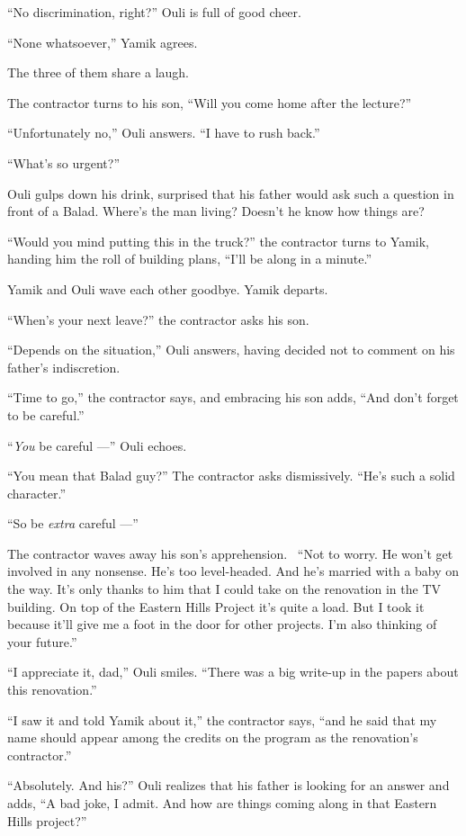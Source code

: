 \documentclass[twoside,11pt,openany]{book}
\begin{document}
``No discrimination, right?'' Ouli is full of good cheer.

``None whatsoever,'' Yamik agrees.

The three of them share a laugh.

The contractor turns to his son, ``Will you come home after the lecture?''

``Unfortunately no,'' Ouli answers. ``I have to rush back.''

``What's so urgent?''

Ouli gulps down his drink, surprised that his father would ask such a question in front of a Balad. Where's the man
living? Doesn't he know how things are?

``Would you mind putting this in the truck?'' the contractor turns to Yamik, handing him the roll of building plans,
``I'll be along in a minute.''

Yamik and Ouli wave each other goodbye. Yamik departs.

``When's your next leave?'' the contractor asks his son.

``Depends on the situation,'' Ouli answers, having decided not to comment on his
father's indiscretion.

``Time to go,'' the contractor says, and embracing his son adds, ``And don't
forget to be careful.''

``\textit{You} be careful ---'' Ouli echoes.

``You mean that Balad guy?'' The contractor asks dismissively. ``He's such a
solid character.''

``So be \textit{extra} careful ---''

The contractor waves away his son's apprehension.~ ``Not to worry. He won't get involved in any nonsense.
He's too level-headed. And he's married with a baby on the way. It's only thanks to him that I could take on the
renovation in the TV building. On top of the Eastern Hills Project it's quite a load. But I took it because it'll give
me a foot in the door for other projects. I'm also thinking of your future.''

``I appreciate it, dad,'' Ouli smiles. ``There was a big write-up in the papers
about this renovation.''

``I saw it and told Yamik about it,'' the contractor says, ``and he said that my
name should appear among the credits on the program as the renovation's contractor.''

``Absolutely. And his?'' Ouli realizes that his father is looking for an answer and adds,
``A bad joke, I admit. And how are things coming along in that Eastern Hills project?''
\end{document}
